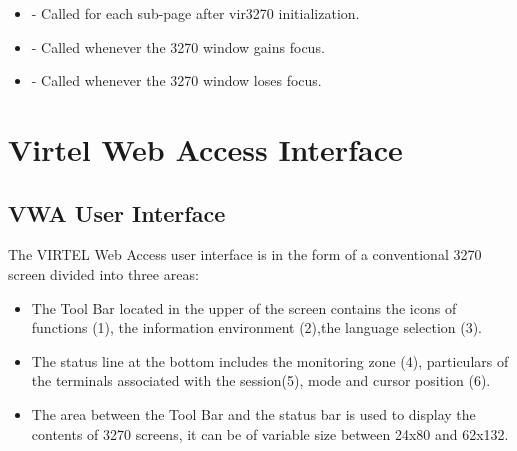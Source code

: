 \documentclass[letterpaper,10pt,english]{sphinxmanual}
\begin{document}
\ignorespaces \begin{itemize}
\item {} 
 - Called for each sub-page after vir3270 initialization.

\end{itemize}

\ignorespaces \begin{itemize}
\item {} 
 - Called whenever the 3270 window gains focus.

\end{itemize}

\ignorespaces \begin{itemize}
\item {} 
 - Called whenever the 3270 window loses focus.

\end{itemize}


\chapter{Virtel Web Access Interface}
\label{\detokenize{Customization:virtel-web-access-interface}}
\ignorespaces 

\section{VWA User Interface}
\label{\detokenize{Customization:vwa-user-interface}}\label{\detokenize{Customization:index-15}}
The VIRTEL Web Access user interface is in the form of a conventional 3270 screen divided into three areas:
\begin{itemize}
\item {} 
The Tool Bar located in the upper of the screen contains the icons of functions (1), the information environment (2),the language selection (3).

\item {} 
The status line at the bottom includes the monitoring zone (4), particulars of the terminals associated with the session(5), mode and cursor position (6).

\item {} 
The area between the Tool Bar and the status bar is used to display the contents of 3270 screens, it can be of variable size between 24x80 and 62x132.

\end{itemize}
\end{document}

